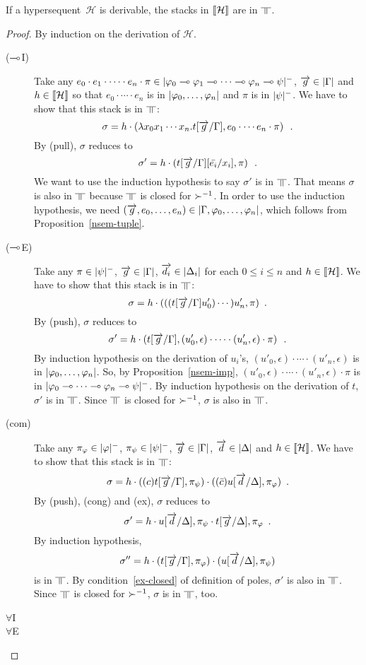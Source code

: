  \begin{theorem}[Adequacy]
  If a hypersequent~$\mathcal H$ is derivable, the stacks in $\llbracket{\mathcal
  H}\rrbracket$ are in $\bbot$.
 \end{theorem}
  \begin{proof}
   By induction on the derivation of $\mathcal{H}$.
   \begin{description}
    \item[($\multimap$I)]
	 Take any $e_0\cdot e_1\cdot \cdots \cdot e_n \cdot \pi \in
	 |{\varphi_0\multimap\varphi_1\multimap\cdots \multimap\varphi_n\multimap\psi}|^-$,
	 $\overrightarrow g\in|{\Gamma}|$ and $h\in\llbracket{\mathcal H}\rrbracket$ so that
	 $e_0\cdot\cdots\cdot e_n$ is in $|{\varphi_0,\ldots,\varphi_n}|$
	 and $\pi$ is in $|{\psi}|^-$.
	 We have to show that this stack is in $\bbot$:
	 \[
	  \sigma = h\cdot \left(\lambda x_0x_1\cdots x_n.t[\overrightarrow g/\Gamma],
	 e_0\cdot \cdots e_n\cdot \pi\right)\enspace.
	 \]
	 By (pull), $\sigma$ reduces to
	 \[
	  \sigma' = h\cdot \left(t[\overrightarrow g/\Gamma][\bar{e_i}/x_i], \pi\right)\enspace.
	 \]
	 We want to use the induction hypothesis to say $\sigma'$ is in
	 $\bbot$.
	 That means $\sigma$ is also in $\bbot$ because $\bbot$ is
	 closed for ${\succ}^{-1}$.
	 In order to use the induction hypothesis, we need
	 $(\overrightarrow g,e_0,\ldots,e_n)\in|{\Gamma,\varphi_0,\ldots,\varphi_n}|$,
	 which follows from Proposition~\ref{nsem-tuple}.
    \item[($\multimap$E)]
	 Take any $\pi\in|{\psi}|^-$, $\overrightarrow g\in|{\Gamma}|$,
	 $\overrightarrow{d_i}\in|{\Delta_i}|$ for each $0\le i\le n$ and
	 $h\in\llbracket{\mathcal H}\rrbracket$.
	 We have to show that this stack is in $\bbot$:
	 \[
	  \sigma = h\cdot (((t[\overrightarrow g/\Gamma]u'_0)\cdots) u'_n, \pi)\enspace.
	 \]
	 By (push), $\sigma$ reduces to
	 \[
	 \sigma' = h\cdot \left(t[\overrightarrow g/\Gamma],
	 (u'_0,\epsilon)\cdot\cdots\cdot (u'_n,\epsilon)\cdot \pi\right)\enspace.
	 \]
	 By induction hypothesis on the derivation of $u_i$'s,
	 $ (u'_0,\epsilon)\cdot\cdots\cdot (u'_n,\epsilon) $ is in
	 $|{\varphi_0,\ldots,\varphi_n}|$.
	 So, by Proposition~\ref{nsem-imp},
	 $(u'_0,\epsilon)\cdot\cdots\cdot (u'_n,\epsilon)\cdot \pi$ is
	 in $|{\varphi_0\multimap\cdots\multimap\varphi_n\multimap\psi}|^-$.
	 By induction hypothesis on the derivation of $t$,
	 $\sigma'$ is in $\bbot$.
	 Since $\bbot$ is closed for ${\succ}^{-1}$, $\sigma$ is also in
	 $\bbot$.
    \item[(com)]
	 Take any $\pi_\varphi\in|{\varphi}|^-$, $\pi_\psi\in|{\psi}|^-$,
	 $\overrightarrow g\in|{\Gamma}|$, $\overrightarrow d\in|{\Delta}|$ and $h\in\llbracket{\mathcal
	 H}\rrbracket$.
	 We have to show that this stack is in $\bbot$:
	 \[
	  \sigma = h\cdot
	 ((c)t[\overrightarrow g/\Gamma],\pi_\psi)\cdot ((\bar{c})u[\overrightarrow d/\Delta], \pi_\varphi)\enspace.
	 \]
	 By (push), (cong) and (ex), $\sigma$ reduces to
	 \[
	  \sigma' = h\cdot u[\overrightarrow d/\Delta], \pi_\psi\cdot t[\overrightarrow g/\Delta],\pi_\varphi\enspace.
	 \]
	 By induction hypothesis,
	 \[
	  \sigma'' = h\cdot (t[\overrightarrow g/\Gamma],\pi_\varphi)\cdot (u[\overrightarrow
	 d/\Delta],\pi_\psi)
	 \]
	 is in $\bbot$.
	 By condition~\ref{ex-closed} of definition of poles, $\sigma'$ is
	 also in $\bbot$.
	 Since $\bbot$ is closed for ${\succ}^{-1}$, $\sigma$ is in $\bbot$,
	 too.
    \item[$\forall$I]
    \item[$\forall$E]
   \end{description}
  \end{proof}

